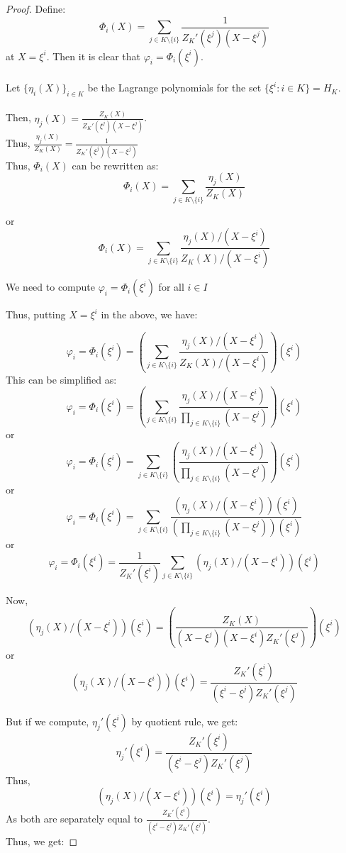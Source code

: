\begin{proof}
    Define:
    $$ \Phi_i(X) = \sum_{j\in K\setminus \{i\}} \frac{1}{Z_K'(\xi^j)(X-\xi^j)} $$
    at $X=\xi^i$. Then it is clear that $\varphi_i=\Phi_i(\xi^i)$.\\\\
    Let $\{\eta_i(X)\}_{i\in K}$ be the Lagrange polynomials for the set $\{\xi^i:i\in K\}= H_K$. \\\\
    Then, $\eta_j(X)=\frac{Z_K(X)}{Z_K'(\xi^j)(X-\xi^j)}$.\\
    Thus, $\frac{\eta_j(X)}{Z_K(X)}=\frac{1}{Z_K'(\xi^j)(X-\xi^j)}$\\
    Thus, $\Phi_i(X)$ can be rewritten as:
    $$\Phi_i(X)=\sum_{j\in K\setminus \{i\}} \frac{\eta_j(X)}{Z_K(X)}$$


    or  $$\Phi_i(X)
    = \sum_{j\in K\setminus \{i\}} \frac{\eta_j(X)/(X-\xi^i)}{Z_K(X)/(X-\xi^i)}$$

    We need to compute $\varphi_i=\Phi_i(\xi^i)$ for all $i \in I$


    Thus, putting $X=\xi^i$ in the above, we have:

    $$\varphi_i = \Phi_i(\xi^i) = \left(\sum_{j\in K\setminus \{i\}}\frac{\eta_j(X)/(X-\xi^i)}{Z_K(X)/(X-\xi^i)}\right)(\xi^i)$$
    This can be simplified as:
    $$\varphi_i = \Phi_i(\xi^i) = \left(\sum_{j\in K\setminus \{i\}}\frac{\eta_j(X)/(X-\xi^i)}{\prod_{j \in K \setminus \{i\}}(X-\xi^j)}\right)(\xi^i)$$
    or $$\varphi_i = \Phi_i(\xi^i) = \sum_{j\in K\setminus \{i\}}\left(\frac{\eta_j(X)/(X-\xi^i)}{\prod_{j \in K \setminus \{i\}}(X-\xi^j)}\right)(\xi^i)$$
    or $$\varphi_i = \Phi_i(\xi^i) = \sum_{j\in K\setminus \{i\}}\frac{\left(\eta_j(X)/(X-\xi^i)\right)(\xi^i)}{\left(\prod_{j \in K \setminus \{i\}}(X-\xi^j)\right)(\xi^i)}$$
    or $$\varphi_i =\Phi_i(\xi^i) =  \frac{1}{Z_K'(\xi^i)}\sum_{j\in K\setminus \{i\}}\left(\eta_j(X)/(X-\xi^i)\right)(\xi^i)$$

    Now, $$ \left(\eta_j(X)/(X-\xi^i)\right)(\xi^i)=\left(\frac{Z_K(X)}{(X-\xi^j)(X-\xi^i)Z_K'(\xi^j)}\right)(\xi^i)$$
    or $$\left(\eta_j(X)/(X-\xi^i)\right)(\xi^i)= \frac{Z_K'(\xi^i)}{(\xi^i-\xi^j)Z_K'(\xi^j)}$$

    But if we compute, $\eta_j'(\xi^i)$ by quotient rule, we get:
    $$\eta_j'(\xi^i)=\frac{Z_K'(\xi^i)}{(\xi^i-\xi^j)Z_K'(\xi^j)}$$
    Thus,
    $$\left(\eta_j(X)/(X-\xi^i)\right)(\xi^i)=\eta_j'(\xi^i) $$
    As both are separately equal to $\frac{Z_K'(\xi^i)}{(\xi^i-\xi^j)Z_K'(\xi^j)}$.\\
    Thus, we get:



\end{proof}
